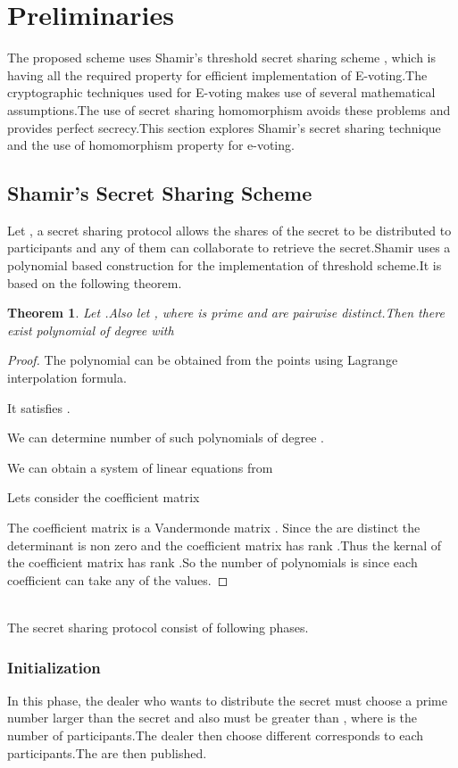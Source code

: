 \documentclass[conference]{IEEEtran}
\newtheorem{thrm}{Theorem}
\newtheorem{proof}{Proof}
\begin{document}
\section{Preliminaries}

The proposed scheme uses Shamir's threshold  secret sharing scheme \cite{shamir1979}, which is having all the required property for efficient implementation of E-voting.The cryptographic techniques used for E-voting makes use of several mathematical assumptions.The use of secret sharing homomorphism avoids these problems and provides perfect secrecy.This section explores Shamir's secret sharing technique and the use of homomorphism property for e-voting.

\subsection{Shamir's Secret Sharing Scheme}

Let , a  secret sharing protocol allows the shares of the secret to be distributed to  participants and any  of them can collaborate to retrieve the secret.Shamir \cite{shamir1979} uses a polynomial based construction for the implementation of   threshold scheme.It is based on the following theorem.

\begin{thrm}
	Let .Also let , where  is prime and  are pairwise distinct.Then there exist  polynomial  of degree 
	with 
\end{thrm}
\begin{proof}
	The polynomial can be obtained from the points  using Lagrange interpolation formula.
	
	
It satisfies .

We can determine number of such polynomials of degree .
 

We can obtain a system of linear equations from 

Lets consider the coefficient matrix 


The coefficient matrix is a Vandermonde matrix \cite{bjorck1970solution}. Since the  are distinct the determinant  is non zero and the coefficient matrix has rank .Thus the kernal of the coefficient matrix has rank .So the number of polynomials is  since each coefficient can take any of the  values.
\end{proof}
\  \\
The secret sharing protocol consist of following phases.\\
\subsubsection{Initialization}
In this phase, the dealer who wants to distribute the secret  must choose a prime number  larger than the secret and also  must be greater than , where  is the number of participants.The dealer then choose different  corresponds to each participants.The  are then published.\\
\end{document}
